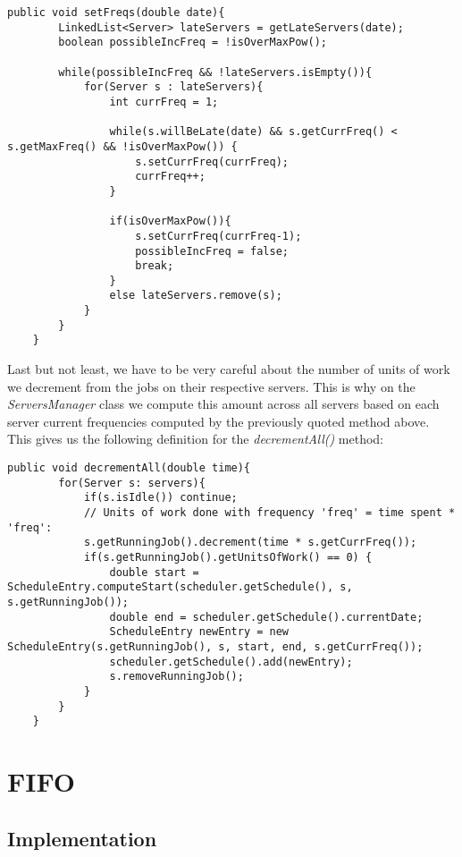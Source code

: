 \documentclass[./report.tex]{subfiles}
\begin{document}
\begin{lstlisting}[style=Java, caption={Source code of the \textit{setFreqs()} method}]
	public void setFreqs(double date){
		LinkedList<Server> lateServers = getLateServers(date);
		boolean possibleIncFreq = !isOverMaxPow();
		
		while(possibleIncFreq && !lateServers.isEmpty()){
			for(Server s : lateServers){
				int currFreq = 1;
				
				while(s.willBeLate(date) && s.getCurrFreq() < s.getMaxFreq() && !isOverMaxPow()) {
					s.setCurrFreq(currFreq);
					currFreq++;
				}
				
				if(isOverMaxPow()){
					s.setCurrFreq(currFreq-1);
					possibleIncFreq = false;
					break;
				}
				else lateServers.remove(s);
			}
		}
	}
\end{lstlisting}
\newpage

Last but not least, we have to be very careful about the number of units of work we decrement from the jobs on their respective servers. This is why on the \textit{ServersManager} class we compute this amount across all servers based on each server current frequencies computed by the previously quoted method above. This gives us the following definition for the \textit{decrementAll()} method:\\

\begin{lstlisting}[style=Java, caption={Source code of the \textit{decrementAll() method in the \textit{ServersManager} class}}]
	public void decrementAll(double time){
		for(Server s: servers){
			if(s.isIdle()) continue;
			// Units of work done with frequency 'freq' = time spent * 'freq':
			s.getRunningJob().decrement(time * s.getCurrFreq());
			if(s.getRunningJob().getUnitsOfWork() == 0) {
				double start = ScheduleEntry.computeStart(scheduler.getSchedule(), s, s.getRunningJob());
				double end = scheduler.getSchedule().currentDate;
				ScheduleEntry newEntry = new ScheduleEntry(s.getRunningJob(), s, start, end, s.getCurrFreq());
				scheduler.getSchedule().add(newEntry);
				s.removeRunningJob();
			}
		}
	}
\end{lstlisting}


\newpage
\section{FIFO}
\subsection{Implementation}
\label{subsec:fifoe}
\end{document}
